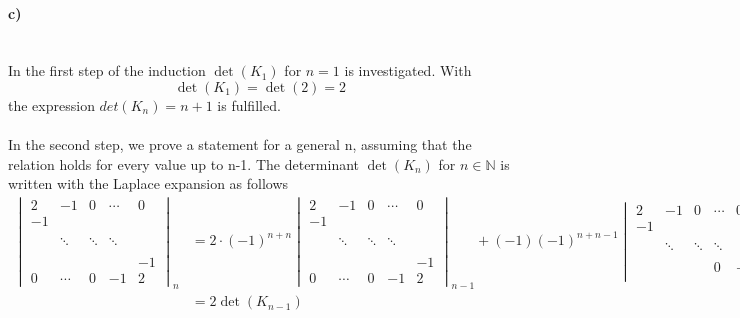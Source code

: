 \documentclass[a4paper]{article}
\begin{document}
\paragraph{c)}\mbox{} \\
In the first step of the induction $\det(K_1)$ for $n = 1$ is investigated. With
\begin{equation}
	\det(K_1) = \det(2) = 2
\end{equation}
the expression $det(K_n) = n + 1 $ is fulfilled.
\\
\\
In the second step, we prove a statement for a general n, assuming that the relation holds for every value up to n-1. The determinant $\det (K_n)$ for $n \in \mathbb{N}$ is written with the Laplace expansion as follows
\begin{align}
	\begin{vmatrix}
		2  & -1      &  0     & \cdots  & 0\\
		-1 &         &        &         &   \\
		   &         &        &         &   \\
		   & \ddots  & \ddots & \ddots  &   \\
		   &         &        &         &   \\
		   &         &        &         & -1\\
		0  & \cdots  &  0     &   -1    & 2
	\end{vmatrix}_n
	&=
	2\cdot(-1)^{n + n}
	\begin{vmatrix}
		2  & -1      &  0     & \cdots  & 0\\
		-1 &         &        &         &   \\
		   &         &        &         &   \\
		   & \ddots  & \ddots & \ddots  &   \\
		   &         &        &         &   \\
		   &         &        &         & -1\\
		0  & \cdots  &  0     &   -1    & 2
	\end{vmatrix}_{n-1}
	+
	(-1)(-1)^{n+n-1}
	\begin{vmatrix}
		2  & -1      &  0     & \cdots  & 0\\
		-1 &         &        &         &   \\
		   &         &        &         &   \\
		   & \ddots  & \ddots & \ddots  &   \\
		   &         &        &         &   \\
		   &         &        &       0 & -1\\
	\end{vmatrix}_{n-1}\\
	&= 2\det (K_{n-1})
\end{align}
\end{document}

